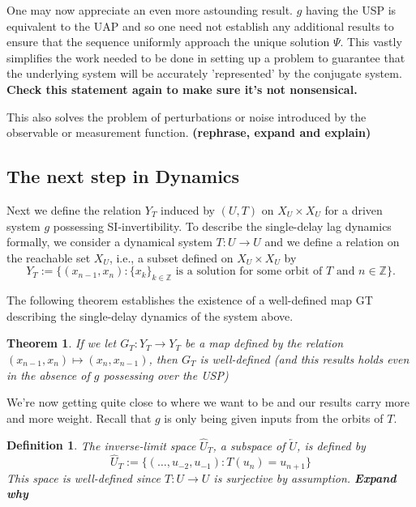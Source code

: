 \documentclass[12 pt]{article}
\newtheorem{Definition}{Definition}[]
\newtheorem{Theorem}{Theorem}[]
\begin{document}
One may now appreciate an even more astounding result. $g$ having the USP is equivalent to the UAP and so one need not establish any additional results to ensure that the sequence uniformly approach the unique solution $\Psi$. This vastly simplifies the work needed to be done in setting up a problem to guarantee that the underlying system will be accurately 'represented' by the conjugate system. \textbf{Check this statement again to make sure it's not nonsensical.} 



This also solves the problem of perturbations or noise introduced by the observable or measurement function. \textbf{(rephrase, expand and explain)}

\subsection{The next step in Dynamics}

Next we define the relation $Y_T$ induced by $(U,T)$ on $X_U\times{X_U}$ for a driven system $g$ possessing SI-invertibility.  To describe the  single-delay lag dynamics formally, we consider a dynamical system $T: U \to U$ and we define a relation on the reachable set $X_U$, i.e., a subset defined on $X_U \times X_U$ by 
$$Y_T:=\{(x_{n-1},x_n): \{x_k\}_{k\in \mathbb{Z}} \mbox{ is a solution for some orbit of } T \mbox{ and } n \in \mathbb{Z}\}.$$ 

The following theorem establishes the existence of a well-defined map GT describing the single-delay dynamics of the system above. 

\begin{Theorem}
If we let $G_T:Y_T\to{Y_T}$ be a map defined by the relation $(x_{n-1},x_n)\mapsto(x_n,x_{n-1})$, then $G_T$ is well-defined (and this results holds even in the absence of $g$ possessing over the USP)  
\end{Theorem}

We're now getting quite close to where we want to be and our results carry more and more weight. Recall that $g$ is only being given inputs from the orbits of $T$.  

\begin{Definition}
  The inverse-limit space $\widehat{U}_T$, a subspace of $\overleftarrow{U}$, is defined by $$\widehat{U}_T:=\{(\ldots, u_{-2}, u_{-1}):T(u_n)=u_{n+1}\}$$ This space is well-defined since $T:U\to{U}$ is surjective by assumption. \textbf{Expand why}
\end{Definition}
\end{document}
